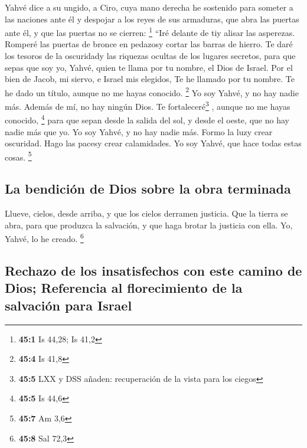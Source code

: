  Yahvé dice a su ungido, a Ciro, cuya mano derecha he
sostenido para someter a las naciones ante él y despojar a los reyes de
sus armaduras, que abra las puertas ante él, y que las puertas no se
cierren: \footnote{\textbf{45:1} Is 44,28; Is 41,2}  ``Iré
delante de tiy alisar las asperezas. Romperé las puertas de bronce en
pedazosy cortar las barras de hierro.  Te daré los tesoros
de la oscuridady las riquezas ocultas de los lugares secretos, para que
sepas que soy yo, Yahvé, quien te llama por tu nombre, el Dios de
Israel.  Por el bien de Jacob, mi siervo, e Israel mis
elegidos, Te he llamado por tu nombre. Te he dado un título, aunque no
me hayas conocido. \footnote{\textbf{45:4} Is 41,8}  Yo
soy Yahvé, y no hay nadie más. Además de mí, no hay ningún Dios. Te
fortaleceré\footnote{\textbf{45:5} LXX y DSS añaden: recuperación de la
  vista para los ciegos} , aunque no me hayas conocido, \footnote{\textbf{45:5}
  Is 44,6}  para que sepan desde la salida del sol, y
desde el oeste, que no hay nadie más que yo. Yo soy Yahvé, y no hay
nadie más.  Formo la luzy crear oscuridad. Hago las pacesy
crear calamidades. Yo soy Yahvé, que hace todas estas cosas. \footnote{\textbf{45:7}
  Am 3,6}

\hypertarget{la-bendiciuxf3n-de-dios-sobre-la-obra-terminada}{%
\subsection{La bendición de Dios sobre la obra
terminada}\label{la-bendiciuxf3n-de-dios-sobre-la-obra-terminada}}

 Llueve, cielos, desde arriba, y que los cielos derramen
justicia. Que la tierra se abra, para que produzca la salvación, y que
haga brotar la justicia con ella. Yo, Yahvé, lo he creado. \footnote{\textbf{45:8}
  Sal 72,3}

\hypertarget{rechazo-de-los-insatisfechos-con-este-camino-de-dios-referencia-al-florecimiento-de-la-salvaciuxf3n-para-israel}{%
\subsection{Rechazo de los insatisfechos con este camino de Dios;
Referencia al florecimiento de la salvación para
Israel}\label{rechazo-de-los-insatisfechos-con-este-camino-de-dios-referencia-al-florecimiento-de-la-salvaciuxf3n-para-israel}}

